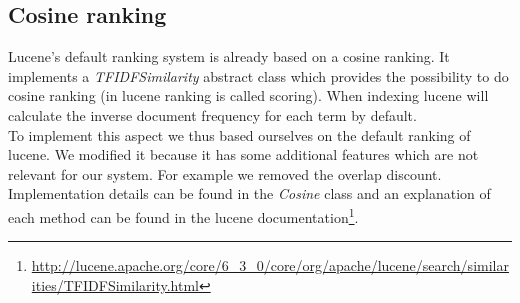 \documentclass{article}
\begin{document}
\subsection{Cosine ranking}
Lucene's default ranking system is already based on a cosine ranking. It implements a \emph{TFIDFSimilarity} abstract class which provides the possibility to do cosine ranking (in lucene ranking is called scoring). When indexing lucene will calculate the inverse document frequency for each term by default.\\
To implement this aspect we thus based ourselves on the default ranking of lucene. We modified it because it has some additional features which are not relevant for our system. For example we removed the overlap discount. Implementation details can be found in the \emph{Cosine} class and an explanation of each method can be found in the lucene documentation\footnote{\url{http://lucene.apache.org/core/6_3_0/core/org/apache/lucene/search/similarities/TFIDFSimilarity.html}}.
\end{document}
